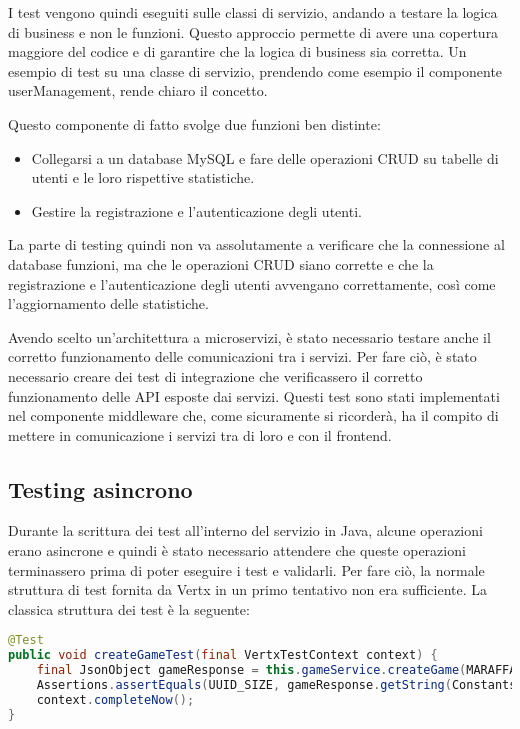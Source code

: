 I test vengono quindi eseguiti sulle classi di servizio, andando a testare la logica di business e non le funzioni. Questo approccio permette di avere una copertura maggiore del codice e di garantire che la logica di business sia corretta.
Un esempio di test su una classe di servizio, prendendo come esempio il componente userManagement, rende chiaro il concetto.

Questo componente di fatto svolge due funzioni ben distinte:
\begin{itemize}
	\item Collegarsi a un database MySQL e fare delle operazioni CRUD su tabelle di utenti e le loro rispettive statistiche. 
	\item Gestire la registrazione e l'autenticazione degli utenti.
\end{itemize}

La parte di testing quindi non va assolutamente a verificare che la connessione al database funzioni, ma che le operazioni CRUD siano corrette e che la registrazione e l'autenticazione degli utenti avvengano correttamente, così come l'aggiornamento delle statistiche.

\vspace{0.5cm}

Avendo scelto un'architettura a microservizi, è stato necessario testare anche il corretto funzionamento delle comunicazioni tra i servizi. Per fare ciò, è stato necessario creare dei test di integrazione che verificassero il corretto funzionamento delle API esposte dai servizi. 
Questi test sono stati implementati nel componente middleware che, come sicuramente si ricorderà, ha il compito di mettere in comunicazione i servizi tra di loro e con il frontend.

\subsection{Testing asincrono}

Durante la scrittura dei test all'interno del servizio in Java, alcune operazioni erano asincrone e quindi è stato necessario attendere che queste operazioni terminassero prima di poter eseguire i test e validarli.
Per fare ciò, la normale struttura di test fornita da Vertx in un primo tentativo non era sufficiente. La classica struttura dei test è la seguente:

\begin{lstlisting}[language=Java, caption={Standard Vertx test}, label=list:test_std_vertx]
@Test
public void createGameTest(final VertxTestContext context) {
    final JsonObject gameResponse = this.gameService.createGame(MARAFFA_PLAYERS, TEST_USER, EXPECTED_SCORE, GAME_MODE.toString(), PASSWORD);
    Assertions.assertEquals(UUID_SIZE, gameResponse.getString(Constants.GAME_ID).length()); // Assuming UUID is 36
    context.completeNow();
}
\end{lstlisting}

